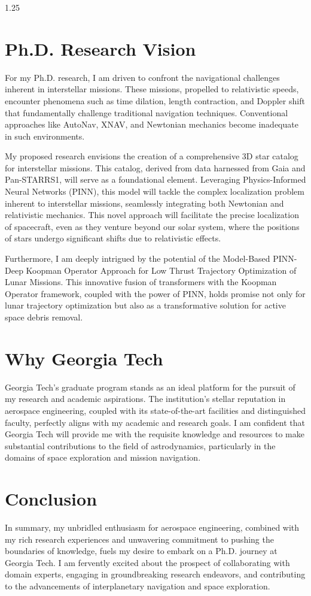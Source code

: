 \documentclass[a4paper,12pt]{article}
\begin{document}
\begin{spacing}{1.25}
\section{Ph.D. Research Vision}
For my Ph.D. research, I am driven to confront the navigational challenges inherent in interstellar missions. These missions, propelled to relativistic speeds, encounter phenomena such as time dilation, length contraction, and Doppler shift that fundamentally challenge traditional navigation techniques. Conventional approaches like AutoNav, XNAV, and Newtonian mechanics become inadequate in such environments.

My proposed research envisions the creation of a comprehensive 3D star catalog for interstellar missions. This catalog, derived from data harnessed from Gaia and Pan-STARRS1, will serve as a foundational element. Leveraging Physics-Informed Neural Networks (PINN), this model will tackle the complex localization problem inherent to interstellar missions, seamlessly integrating both Newtonian and relativistic mechanics. This novel approach will facilitate the precise localization of spacecraft, even as they venture beyond our solar system, where the positions of stars undergo significant shifts due to relativistic effects.

Furthermore, I am deeply intrigued by the potential of the Model-Based PINN-Deep Koopman Operator Approach for Low Thrust Trajectory Optimization of Lunar Missions. This innovative fusion of transformers with the Koopman Operator framework, coupled with the power of PINN, holds promise not only for lunar trajectory optimization but also as a transformative solution for active space debris removal.

\section{Why Georgia Tech}
Georgia Tech's graduate program stands as an ideal platform for the pursuit of my research and academic aspirations. The institution's stellar reputation in aerospace engineering, coupled with its state-of-the-art facilities and distinguished faculty, perfectly aligns with my academic and research goals. I am confident that Georgia Tech will provide me with the requisite knowledge and resources to make substantial contributions to the field of astrodynamics, particularly in the domains of space exploration and mission navigation.

\section{Conclusion}
In summary, my unbridled enthusiasm for aerospace engineering, combined with my rich research experiences and unwavering commitment to pushing the boundaries of knowledge, fuels my desire to embark on a Ph.D. journey at Georgia Tech. I am fervently excited about the prospect of collaborating with domain experts, engaging in groundbreaking research endeavors, and contributing to the advancements of interplanetary navigation and space exploration.

\end{spacing}
\end{document}

